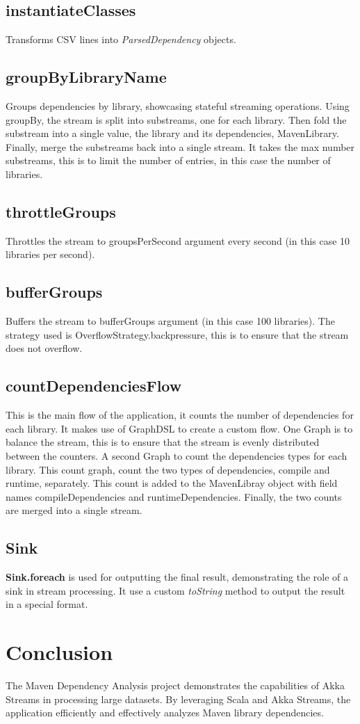\documentclass{article}
\begin{document}
    \subsection*{instantiateClasses}
    Transforms CSV lines into \textit{ParsedDependency} objects.
    \subsection*{groupByLibraryName}
    Groups dependencies by library, showcasing stateful streaming operations.
    Using groupBy, the stream is split into substreams, one for each library.
    Then fold the substream into a single value, the library and its dependencies, MavenLibrary.
    Finally, merge the substreams back into a single stream.
    It takes the max number substreams, this is to limit the number of entries, in this case the number of libraries.
    \subsection*{throttleGroups}
    Throttles the stream to groupsPerSecond argument every second (in this case 10 libraries per second).
    \subsection*{bufferGroups}
    Buffers the stream to bufferGroups argument (in this case 100 libraries).
    The strategy used is OverflowStrategy.backpressure, this is to ensure that the stream does not overflow.
    \subsection*{countDependenciesFlow}
    This is the main flow of the application, it counts the number of dependencies for each library.
    It makes use of GraphDSL to create a custom flow.
    One Graph is to balance the stream, this is to ensure that the stream is evenly distributed between the counters.
    A second Graph to count the dependencies types for each library.
    This count graph, count the two types of dependencies, compile and runtime, separately.
    This count is added to the MavenLibray object with field names compileDependencies and runtimeDependencies.
    Finally, the two counts are merged into a single stream.

    \subsection{Sink}
    \textbf{Sink.foreach} is used for outputting the final result, demonstrating the role of a sink in stream processing. It use a custom \textit{toString} method to output the result in a special format.

    \section{Conclusion}
    The Maven Dependency Analysis project demonstrates the capabilities of Akka Streams in processing large datasets. By leveraging Scala and Akka Streams, the application efficiently and effectively analyzes Maven library dependencies.
\end{document}
